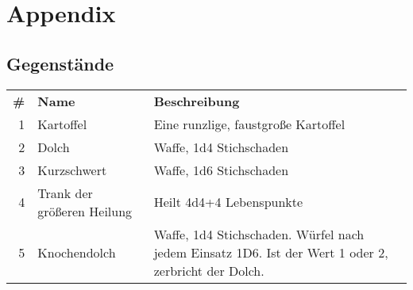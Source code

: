
\chapter{Appendix}

\section{Gegenstände}

\bgroup
\def\arraystretch{1.5}%
\begin{tabularx}{\textwidth}{ r X X }
\textbf{\#} & \textbf{Name} & \textbf{Beschreibung} \\\cline{1-3}
1 & Kartoffel & Eine runzlige, faustgroße Kartoffel \\\cline{1-3}
2 & Dolch & Waffe, 1d4 Stichschaden \\\cline{1-3}
3 & Kurzschwert & Waffe, 1d6 Stichschaden\\\cline{1-3}
4 & Trank der größeren Heilung & Heilt 4d4+4 Lebenspunkte\\\cline{1-3}
5 & Knochendolch & Waffe, 1d4 Stichschaden. Würfel nach jedem Einsatz 1D6. Ist der Wert 1 oder 2, zerbricht der Dolch.
\end{tabularx}
\egroup
